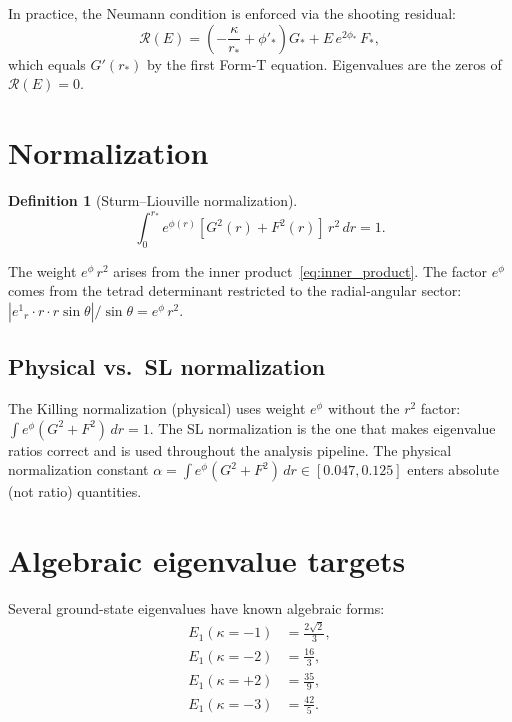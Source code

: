 \documentclass[11pt,letterpaper]{article}
\newtheorem{definition}[theorem]{Definition}
\numberwithin{equation}{section}
\begin{document}
In practice, the Neumann condition is enforced via the shooting residual:
\begin{equation}
\label{eq:residual}
  \mathcal{R}(E) = \left(-\frac{\kappa}{r_*} + \phi'_*\right)G_* + E\,e^{2\phi_*}\,F_*,
\end{equation}
which equals $G'(r_*)$ by the first Form-T equation. Eigenvalues are the
zeros of $\mathcal{R}(E) = 0$.

\section{Normalization}
\label{sec:normalization}

\begin{definition}[Sturm--Liouville normalization]
\begin{equation}
\label{eq:sl_norm}
\boxed{
  \int_0^{r_*} e^{\phi(r)}\!\left[G^2(r) + F^2(r)\right]\,r^2\,dr = 1.
}
\end{equation}
\end{definition}

The weight $e^{\phi}\,r^2$ arises from the inner product~\eqref{eq:inner_product}.
The factor $e^{\phi}$ comes from the tetrad determinant restricted to the
radial-angular sector: $|e^1{}_r \cdot r \cdot r\sin\theta| / \sin\theta = e^{\phi}\,r^2$.

\subsection{Physical vs.\ SL normalization}

The Killing normalization (physical) uses weight $e^{\phi}$ without the $r^2$
factor: $\int e^{\phi}(G^2+F^2)\,dr = 1$. The SL normalization is the one
that makes eigenvalue ratios correct and is used throughout the analysis
pipeline. The physical normalization constant
$\alpha = \int e^{\phi}(G^2+F^2)\,dr \in [0.047, 0.125]$ enters absolute
(not ratio) quantities.

\section{Algebraic eigenvalue targets}
\label{sec:algebraic}

Several ground-state eigenvalues have known algebraic forms:
\begin{align}
  E_1(\kappa=-1) &= \frac{2\sqrt{2}}{3}, \label{eq:E1_km1}\\
  E_1(\kappa=-2) &= \frac{16}{3}, \label{eq:E1_km2}\\
  E_1(\kappa=+2) &= \frac{35}{9}, \label{eq:E1_kp2}\\
  E_1(\kappa=-3) &= \frac{42}{5}. \label{eq:E1_km3}
\end{align}
\end{document}
